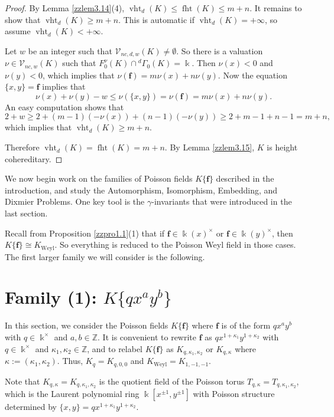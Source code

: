 \documentclass[12pt]{amsart}
\theoremstyle{plain}
\numberwithin{theorem}{section}
\numberwithin{equation}{theorem}
\theoremstyle{definition}
\newcommand{\ZZ}{\mathbb{Z}}
\DeclareMathOperator{\fht}{fht}
\DeclareMathOperator{\vht}{vht}
\newcommand \bff {{\mathbf{f}}}
\DeclareMathOperator{\Weyl}{Weyl}
\newcommand \Kweyl {K_{\Weyl}}
\newcommand \kx {\Bbbk^\times}
\begin{document}
\begin{proof} By Lemma \ref{zzlem3.14}(4), $\vht_d(K)
\leq \fht(K)\leq m+n$. It remains to show 
that $\vht_d(K)\geq m+n$. This is automatic if $\vht_d(K) = +\infty$, so assume $\vht_d(K) < +\infty$.

Let $w$ be an integer such that ${\mathcal V}_{nc,d,w}(K)
\neq \emptyset$. So there is a valuation  
$\nu\in {\mathcal V}_{nc,w}(K)$ such that 
$F^{\nu}_0(K)\cap {^d\Gamma}_{0}(K)=\Bbbk$.  
Then $\nu(x)<0$ and $\nu(y)<0$, which implies
that $\nu(\bff)=m \nu(x)+n \nu(y)$. Now the
equation $\{x,y\}=\bff$ implies that
$$\nu(x)+\nu(y)-w \leq \nu(\{x,y\})=
\nu(\bff)=m \nu(x)+n \nu(y).$$
An easy computation shows that
$$2+ w\geq 2+ (m-1)(-\nu(x))+(n-1) (-\nu(y))
\geq 2+ m-1+n-1=m+n,$$
which implies that $\vht_d(K)\geq m+n$.

Therefore $\vht_d(K)=\fht(K)=m+n$.  By Lemma \ref{zzlem3.15}, $K$ is height cohereditary.
\end{proof}


We now begin work on the families of Poisson 
fields $K\{\bff\}$ described in the introduction, and study the Automorphism, Isomorphism, Embedding, and Dixmier Problems. One key tool is the $\gamma$-invariants 
that were introduced in the last section. 


Recall from Proposition \ref{zzpro1.1}(1) that if $\bff \in \Bbbk(x)^{\times}$ or $\bff \in \Bbbk(y)^\times$, then $K\{\bff\}\cong \Kweyl$. So everything is 
reduced to the Poisson Weyl field in those cases. The first larger family 
we will consider is the following.  


\section{Family (1): $K\{ q x^a y^b\}$}
\label{zzsec4}

In this section, we consider the Poisson fields
$K\{\bff\}$ where $\bff$ is of the form $q x^a y^b$ with $q \in \kx$ and $a,b \in \ZZ$. It is convenient to 
rewrite $\bff$ as $q x^{1+\kappa_1} y^{1+\kappa_2}$ 
with $q\in \Bbbk^{\times}$ and $\kappa_1,\kappa_2\in {\ZZ}$, and to relabel $K\{\bff\}$ as $K_{q,\kappa_1,\kappa_2}$ or $K_{q,\kappa}$ where $\kappa := (\kappa_1,\kappa_2)$.  Thus, $K_q = K_{q,0,0}$ and $\Kweyl = K_{1,-1,-1}$.

Note that $K_{q,\kappa} = K_{q,\kappa_1,\kappa_2}$ is the quotient field of the 
Poisson torus $T_{q,\kappa} = T_{q,\kappa_1,\kappa_2}$, which is the Laurent polynomial ring
$\Bbbk[x^{\pm 1}, y^{\pm 1}]$ with 
Poisson structure determined by $\{x,y\} = q x^{1+\kappa_1} y^{1+\kappa_2}$.
\end{document}
